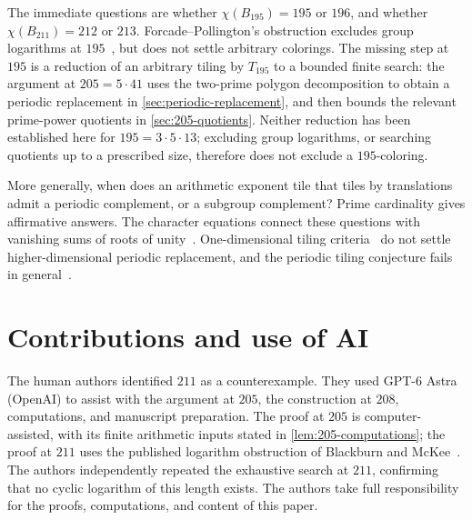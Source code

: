 \documentclass[11pt,reqno]{amsart}
\theoremstyle{definition}
\theoremstyle{remark}
\numberwithin{equation}{section}
\begin{document}
The immediate questions are whether $\chi(B_{195})=195$ or $196$,
and whether $\chi(B_{211})=212$ or $213$.
Forcade--Pollington's obstruction excludes group logarithms at
$195$~\cite{FP}, but does not settle arbitrary colorings. The missing
step at $195$ is a reduction of an arbitrary tiling by $T_{195}$ to a
bounded finite search: the argument at $205=5\cdot41$ uses the
two-prime polygon decomposition to obtain a periodic replacement in
\cref{sec:periodic-replacement}, and then bounds the relevant
prime-power quotients in \cref{sec:205-quotients}. Neither reduction
has been established here for $195=3\cdot5\cdot13$; excluding group
logarithms, or searching quotients up to a prescribed size, therefore
does not exclude a $195$-coloring.

More generally, when does an arithmetic exponent tile that tiles by
translations admit a periodic complement, or a subgroup complement?
Prime cardinality gives affirmative answers. The character equations
connect these questions with vanishing sums of roots of unity~\cite{LL}.
One-dimensional tiling criteria~\cite{CM} do not settle
higher-dimensional periodic replacement, and the periodic tiling
conjecture fails in general~\cite{GT}.

\section*{Contributions and use of AI}
The human authors identified $211$ as a counterexample. They used
GPT-6 Astra (OpenAI) to assist with the argument at $205$, the construction
at $208$, computations, and manuscript preparation. The proof at $205$
is computer-assisted, with its finite arithmetic inputs stated in
\cref{lem:205-computations}; the proof at $211$ uses the published
logarithm obstruction of Blackburn and McKee~\cite{BM}.
The authors independently repeated the exhaustive search at $211$,
confirming that no cyclic logarithm of this length exists.
The authors take full responsibility for the proofs, computations,
and content of this paper.

\clearpage
\appendix
\end{document}
